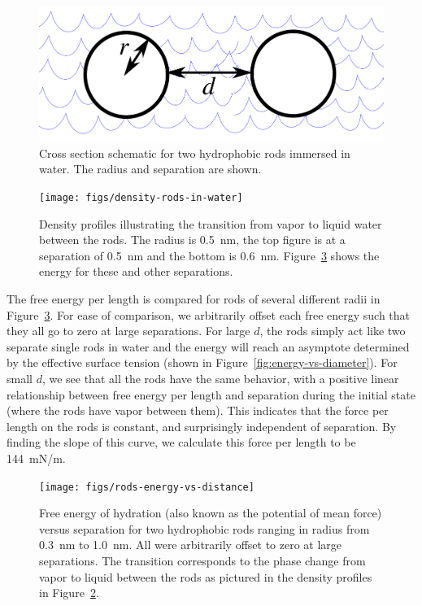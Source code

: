 \documentclass[letterpaper,twocolumn,amsmath,amssymb,prb]{revtex4-1}
\begin{document}
\begin{figure}
\begin{center}
\includegraphics[width=\columnwidth]{figs/rods-diagram}
\end{center}
\caption{ Cross section schematic for two hydrophobic rods immersed in water.
The radius and separation are shown.}
\label{fig:rods}
\end{figure}

\begin{figure}
\begin{center}
\texttt{[image: figs/density-rods-in-water]}
\end{center}
\caption{ Density profiles illustrating the transition from vapor 
to liquid water between the rods. The radius is 0.5~nm, the top figure is 
at a separation of 0.5~nm and the
bottom is 0.6~nm. Figure~\ref{fig:rods-energy-vs-distance} shows
the energy for these and other separations.}
\label{fig:density-rods}
\end{figure}

The free energy per length is compared for rods of several different radii
in Figure~\ref{fig:rods-energy-vs-distance}. For ease of comparison, we 
arbitrarily offset each free energy such that they all go 
to zero at large separations. For large $d$, the rods 
simply act like two separate single rods in water and the energy will
reach an asymptote determined by the effective surface tension (shown in 
Figure~\ref{fig:energy-vs-diameter}). For small $d$, we see that all the rods 
have the same behavior, with a positive linear relationship
between free energy per length and separation during the initial state 
(where the rods have vapor between them). This indicates that the force 
per length on the rods is constant, and surprisingly independent of separation. 
By finding the slope of this curve, we calculate this force per length to be 144~mN/m.

\begin{figure}
\begin{center}
\texttt{[image: figs/rods-energy-vs-distance]}
\end{center}
\caption{ Free energy of hydration (also known as the potential of mean force) 
versus separation for two hydrophobic rods ranging in radius from
0.3~nm to 1.0~nm.
All were arbitrarily offset to zero at large separations. The
transition corresponds to the phase change from
vapor to liquid between the rods as pictured in the density profiles in 
Figure~\ref{fig:density-rods}. }
\label{fig:rods-energy-vs-distance}
\end{figure}
\end{document}
